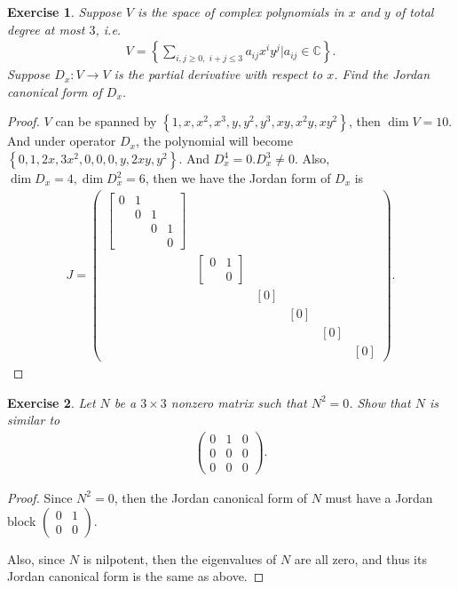 \documentclass[11pt]{book}
\newtheorem{exercise}{Exercise}[section]
\theoremstyle{definition}
\numberwithin{equation}{subsection}
\begin{document}
\begin{exercise}
Suppose $V$ is the space of complex polynomials in $x$ and $y$ of total degree at most $3$, i.e.
\begin{align*}
    V = \left\{\sum_{i,j \geq 0, \,\, i+j \leq 3} a_{ij} x^i y^j \Bigg| a_{ij} \in \mathbb{C} \right\}.
\end{align*}
Suppose $D_x: V \to V$ is the partial derivative with respect to $x$. Find the Jordan canonical form of $D_x$.
\end{exercise}
\begin{proof}
$V$ can be spanned by $\left\{1, x, x^2, x^3, y, y^2, y^3, xy, x^2y, xy^2\right\}$, then $\dim V = 10$. And under operator $D_x$, the polynomial will become $\left\{0, 1, 2x, 3x^2, 0, 0, 0, y, 2xy, y^2\right\}$. And $D_x^4 = 0. D_x^3 \neq 0$. Also, $\dim D_x = 4, \dim D_x^2 = 6$, then we have the Jordan form of $D_x$ is
\begin{align*}
    J = \begin{pmatrix}
        \begin{bmatrix}
            0 & 1 &   & \\
              & 0 & 1 & \\
              &   & 0 & 1 \\
              &   &   & 0
        \end{bmatrix} &  &  &  &  & \\
        & \begin{bmatrix}
            0 & 1 \\
              & 0
        \end{bmatrix} &  &  &  & \\
        &  & [0] &  &  & \\
        &  &  & [0] &  & \\
        &  &  &  & [0] & \\
        &  &  &  &  & [0]
    \end{pmatrix}.
\end{align*}
\end{proof}

\medskip

\begin{exercise}
Let $N$ be a $3 \times 3$ nonzero matrix such that $N^2 = 0$. Show that $N$ is similar to
\begin{align*}
    \begin{pmatrix}
        0 & 1 & 0 \\
        0 & 0 & 0 \\
        0 & 0 & 0
    \end{pmatrix}.
\end{align*}
\end{exercise}
\begin{proof}
Since $N^2 = 0$, then the Jordan canonical form of $N$ must have a Jordan block $\begin{pmatrix}
    0 & 1 \\
    0 & 0 
\end{pmatrix}$.

Also, since $N$ is nilpotent, then the eigenvalues of $N$ are all zero, and thus its Jordan canonical form is the same as above. 
\end{proof}
\end{document}
